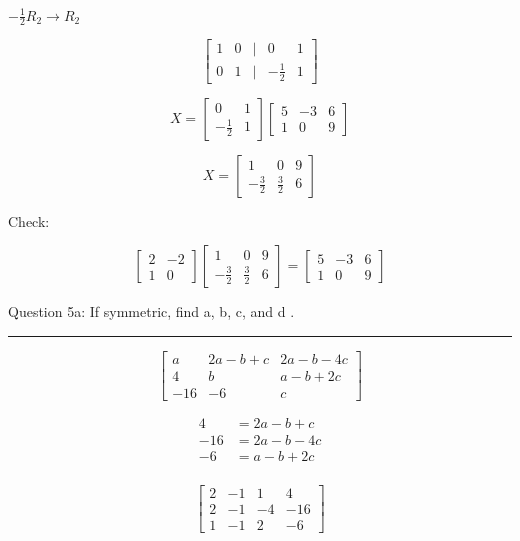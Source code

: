 \documentclass[a4paper,11pt,twoside]{report}
\begin{document}
$-\frac{1}{2}R_2 \to R_2$

\[	\begin{bmatrix}  1 & 0 & | & 0 & 1 \\ 0 & 1 & | & -\frac{1}{2} & 1 \end{bmatrix}	\]

\[X = \begin{bmatrix} 0 & 1 \\ -\frac{1}{2} & 1 \end{bmatrix} \begin{bmatrix} 5 & -3 & 6 \\ 1 & 0 & 9 \end{bmatrix}  \]

\[\boxed{X =\begin{bmatrix} 1 & 0 & 9 \\ -\frac{3}{2} & \frac{3}{2} & 6 \end{bmatrix} }\]

Check:

\[\begin{bmatrix} 2 & -2 \\ 1 & 0 \end{bmatrix} \begin{bmatrix} 1 & 0 & 9 \\ -\frac{3}{2} & \frac{3}{2} & 6 \end{bmatrix} = \begin{bmatrix} 5 & -3 & 6 \\ 1 & 0 & 9 \end{bmatrix} \]

\noindent Question 5a: If symmetric, find a, b, c, and d . \\ \hrule

\[\begin{bmatrix} a & 2a-b+c & 2a -b -4c \\ 4 & b & a-b+2c \\ -16 & -6 & c \end{bmatrix} \]

\begin{align*}
	4 &= 2a - b + c \\
	-16 &=  2a - b -4c \\
	-6 &=  a - b + 2c \\
\end{align*}

\[\begin{bmatrix} 2 & -1 & 1 & 4 \\ 2 & -1 & -4 & -16 \\ 1 & -1 & 2 & -6 \end{bmatrix} \]
\end{document}
